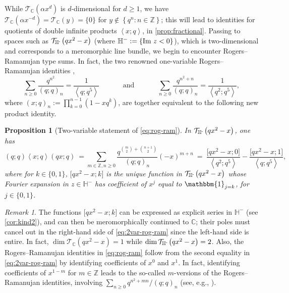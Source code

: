 \documentclass[reqno,11pt]{amsart}
\newtheorem{proposition}[theorem]{Proposition}
\theoremstyle{definition}
\theoremstyle{remark}
\newtheorem*{remark}{Remark}
\numberwithin{equation}{section}
\newcommand{\Z}{\mathbb{Z}}
\newcommand{\C}{\mathbb{C}}
\renewcommand{\H}{{\mathbb{H}}}
\newcommand{\Hminus}{{\mathbb{H}^{\textnormal{-}\hspace{-0.03cm}}}}
\newcommand{\mT}{\mathcal{T}}
\newcommand{\one}{\mathbbm{1}}
\renewcommand{\Im}{\textnormal{Im}\ }
\newcommand{\la}{\left\langle}
\newcommand{\ra}{\right\rangle}
\newcommand{\vect}[2]{\big[{#1};{#2}\big]}
\begin{document}
While $\mT_\C\left(\alpha x^d\right)$ is $d$-dimensional for $d \ge 1$, we have $\mT_\C\left(\alpha x^{-d}\right) = \mT_\C(y) = \{0\}$ for $y \not\in \left\{q^n : n \in \Z\right\}$; this will lead to identities for quotients of double infinite products $\la x; q\ra$, in \cref{prop:fractional}. Passing to spaces such as $\mT_\Hminus\left(qx^2-x\right)$ (where $\H^- := \{\Im z < 0\}$), which is two-dimensional and corresponds to a meromorphic line bundle, we begin to encounter Rogers--Ramanujan type sums. In fact, the two renowned one-variable Rogers--Ramanujan identities \cite[p.~290]{hardy1979introduction},
\begin{equation} \label{eq:rog-ram}
    \sum_{n \geq 0} \frac{q^{n^2}}{(q; q)_n} = \frac{1}{\la q; q^5 \ra} \qquad\quad \text{ and }\qquad\quad 
    \sum_{n \geq 0} \frac{q^{n^2+n}}{(q; q)_n} = \frac{1}{\la q^2; q^5 \ra},
\end{equation}
where $(x; q)_n := \prod_{k = 0}^{n-1} \left(1 - xq^k\right)$, are together equivalent to the following new product identity.

\begin{proposition}[Two-variable statement of \cref{eq:rog-ram}]\label{prop:2var-rog-ram}
In $\mT_\Hminus\left(qx^2-x\right)$, one has 
\begin{equation}\label{eq:2var-rog-ram}
    (q; q) \la x; q \ra (qx; q)\ =  
    \sum_{m \in \Z, n \ge 0} \frac{q^{\binom{m}{2} + \binom{n+1}{2}}}{(q; q)_n} (-x)^{m+n}
    \ =\ 
    \frac{\vect{qx^2 - x}{0}}{\la q^2; q^5 \ra} - \frac{\vect{qx^2 - x}{1}}{\la q; q^5 \ra},
\end{equation}
where for $k \in \{0, 1\}$, $\vect{qx^2 - x}{k}$ is the unique function in $\mT_\Hminus\left(qx^2-x\right)$ whose Fourier expansion in $z \in \H^-$ has coefficient of $x^j$ equal to $\one_{j = k}$, for $j \in \{0, 1\}$. %
\end{proposition}

\begin{remark}
The functions $\vect{qx^2-x}{k}$ can be expressed as explicit series in $\H^-$ (see \cref{cor:kind2}), and can then be meromorphically continued to $\C$; their poles must cancel out in the right-hand side of \cref{eq:2var-rog-ram} since the left-hand side is entire. In fact, $\dim \mT_\C\left(qx^2 - x\right) = 1$ while $\dim \mT_\Hminus\left(qx^2 - x\right) = 2$. Also, the Rogers--Ramanujan identities in \cref{eq:rog-ram} follow from the second equality in \cref{eq:2var-rog-ram} by identifying coefficients of $x^0$ and $x^1$. In fact, identifying coefficients of $x^{1-m}$ for $m \in \Z$ leads to the so-called $m$-versions of the Rogers--Ramanujan identities, involving $\sum_{n \ge 0} q^{n^2 + mn}/(q; q)_n$ (see, e.g., \cite[(3.5)]{garrett1999variants}).
\end{remark}
\end{document}

